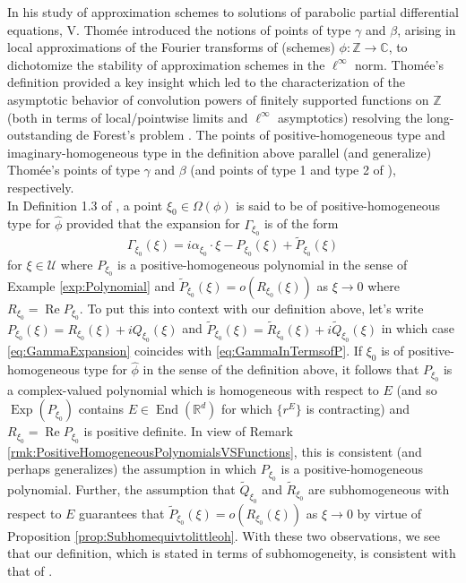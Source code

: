 \documentclass[11pt]{article}
\theoremstyle{remark}
\renewcommand\Re{\operatorname{Re}}%
\newcommand\End{\operatorname{End}} %
\newcommand\Exp{\operatorname{Exp}}
\begin{document}
\noindent In his study of approximation schemes to solutions of parabolic partial differential equations, V. Thom\'{e}e introduced the notions of points of type $\gamma$ and $\beta$, arising in local approximations of the Fourier transforms of (schemes) $\phi:\mathbb{Z}\to\mathbb{C}$, to dichotomize the stability of approximation schemes in the $\ell^\infty$ norm\cite{Thomee1965}. Thom\'{e}e's definition provided a key insight which led to the characterization of the asymptotic behavior of convolution powers of finitely supported functions on $\mathbb{Z}$ (both in terms of local/pointwise limits and $\ell^\infty$ asymptotics) resolving the long-outstanding de Forest's problem \cite{Randles2015}. The points of positive-homogeneous type and imaginary-homogeneous type in the definition above parallel (and generalize) Thom\'{e}e's points of type $\gamma$ and $\beta$ (and points of type 1 and type 2 of \cite{Randles2015}), respectively.\\

\noindent In Definition 1.3 of \cite{Randles2017}, a point $\xi_0\in\Omega(\phi)$ is said to be of positive-homogeneous type for $\widehat{\phi}$ provided that the expansion for $\Gamma_{\xi_0}$ is of the form
\begin{equation}\label{eq:GammaInTermsofP}
    \Gamma_{\xi_0}(\xi)=i\alpha_{\xi_0}\cdot\xi-P_{\xi_0}(\xi)+\widetilde{P}_{\xi_0}(\xi)
\end{equation}
for $\xi\in\mathcal{U}$ where $P_{\xi_0}$ is a positive-homogeneous polynomial in the sense of Example \ref{exp:Polynomial} and $\widetilde{P}_{\xi_0}(\xi)=o(R_{\xi_0}(\xi))$ as $\xi\to 0$ where $R_{\xi_0}=\Re P_{\xi_0}$. To put this into context with our definition above, let's write $P_{\xi_0}(\xi)=R_{\xi_0}(\xi)+iQ_{\xi_0}(\xi)$ and $\widetilde{P}_{\xi_0}(\xi)=\widetilde{R}_{\xi_0}(\xi)+i\widetilde{Q}_{\xi_0}(\xi)$ in which case \eqref{eq:GammaExpansion} coincides with \eqref{eq:GammaInTermsofP}. If $\xi_0$ is of positive-homogeneous type for $\widehat{\phi}$ in the sense of the definition above, it follows that $P_{\xi_0}$ is a complex-valued polynomial which is homogeneous with respect to $E$ (and so $\Exp(P_{\xi_0})$ contains $E\in\End(\mathbb{R}^d)$ for which $\{r^E\}$ is contracting) and $R_{\xi_0}=\Re P_{\xi_0}$ is positive definite. In view of Remark \ref{rmk:PositiveHomogeneousPolynomialsVSFunctions}, this is consistent (and perhaps generalizes) the assumption in which $P_{\xi_0}$ is a positive-homogeneous polynomial. Further, the assumption that $\widetilde{Q}_{\xi_0}$ and $\widetilde{R}_{\xi_0}$ are subhomogeneous with respect to $E$ guarantees that $\widetilde{P}_{\xi_0}(\xi)=o(R_{\xi_0}(\xi))$ as $\xi\to 0$ by virtue of Proposition \ref{prop:Subhomequivtolittleoh}. With these two observations, we see that our definition, which is stated in terms of subhomogeneity, is consistent with that of \cite{Randles2017}. \\
\end{document}
